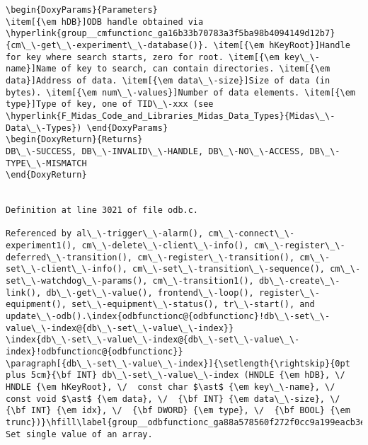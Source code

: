 \begin{DoxyItemize}
\begin{DoxyCode}
\begin{verbatim}
\begin{DoxyParams}{Parameters}
\item[{\em hDB}]ODB handle obtained via \hyperlink{group__cmfunctionc_ga16b33b70783a3f5ba98b4094149d12b7}{cm\_\-get\_\-experiment\_\-database()}. \item[{\em hKeyRoot}]Handle for key where search starts, zero for root. \item[{\em key\_\-name}]Name of key to search, can contain directories. \item[{\em data}]Address of data. \item[{\em data\_\-size}]Size of data (in bytes). \item[{\em num\_\-values}]Number of data elements. \item[{\em type}]Type of key, one of TID\_\-xxx (see \hyperlink{F_Midas_Code_and_Libraries_Midas_Data_Types}{Midas\_\-Data\_\-Types}) \end{DoxyParams}
\begin{DoxyReturn}{Returns}
DB\_\-SUCCESS, DB\_\-INVALID\_\-HANDLE, DB\_\-NO\_\-ACCESS, DB\_\-TYPE\_\-MISMATCH 
\end{DoxyReturn}


Definition at line 3021 of file odb.c.

Referenced by al\_\-trigger\_\-alarm(), cm\_\-connect\_\-experiment1(), cm\_\-delete\_\-client\_\-info(), cm\_\-register\_\-deferred\_\-transition(), cm\_\-register\_\-transition(), cm\_\-set\_\-client\_\-info(), cm\_\-set\_\-transition\_\-sequence(), cm\_\-set\_\-watchdog\_\-params(), cm\_\-transition1(), db\_\-create\_\-link(), db\_\-get\_\-value(), frontend\_\-loop(), register\_\-equipment(), set\_\-equipment\_\-status(), tr\_\-start(), and update\_\-odb().\index{odbfunctionc@{odbfunctionc}!db\_\-set\_\-value\_\-index@{db\_\-set\_\-value\_\-index}}
\index{db\_\-set\_\-value\_\-index@{db\_\-set\_\-value\_\-index}!odbfunctionc@{odbfunctionc}}
\paragraph[{db\_\-set\_\-value\_\-index}]{\setlength{\rightskip}{0pt plus 5cm}{\bf INT} db\_\-set\_\-value\_\-index (HNDLE {\em hDB}, \/  HNDLE {\em hKeyRoot}, \/  const char $\ast$ {\em key\_\-name}, \/  const void $\ast$ {\em data}, \/  {\bf INT} {\em data\_\-size}, \/  {\bf INT} {\em idx}, \/  {\bf DWORD} {\em type}, \/  {\bf BOOL} {\em trunc})}\hfill\label{group__odbfunctionc_ga88a578560f272f0cc9a199eacb3e1048}
Set single value of an array.


\end{verbatim}
\end{DoxyCode}
\end{DoxyItemize}
